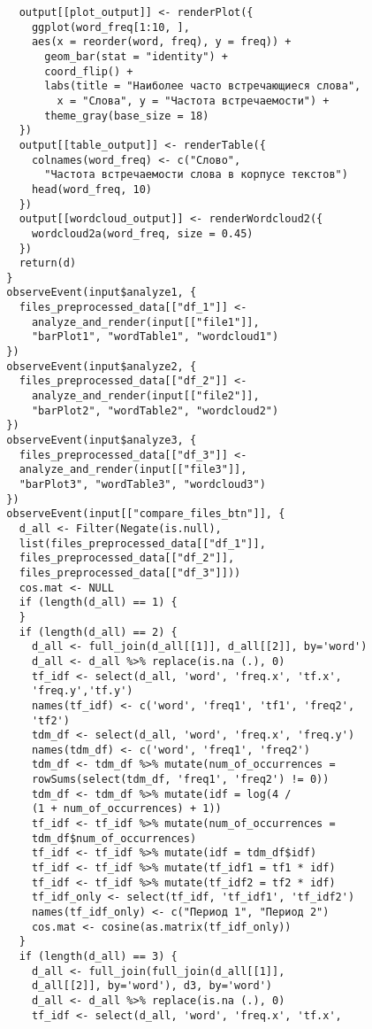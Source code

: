 \documentclass[bachelor, och, diploma ]{SCWorks}
\begin{document}
\begin{verbatim}
    output[[plot_output]] <- renderPlot({
      ggplot(word_freq[1:10, ], 
      aes(x = reorder(word, freq), y = freq)) +
        geom_bar(stat = "identity") +
        coord_flip() +
        labs(title = "Наиболее часто встречающиеся слова", 
          x = "Слова", y = "Частота встречаемости") +
        theme_gray(base_size = 18)
    })
    output[[table_output]] <- renderTable({
      colnames(word_freq) <- c("Слово", 
        "Частота встречаемости слова в корпусе текстов")
      head(word_freq, 10)
    })
    output[[wordcloud_output]] <- renderWordcloud2({
      wordcloud2a(word_freq, size = 0.45)
    })
    return(d)
  }
  observeEvent(input$analyze1, {
    files_preprocessed_data[["df_1"]] <- 
      analyze_and_render(input[["file1"]],
      "barPlot1", "wordTable1", "wordcloud1")
  })
  observeEvent(input$analyze2, {
    files_preprocessed_data[["df_2"]] <- 
      analyze_and_render(input[["file2"]], 
      "barPlot2", "wordTable2", "wordcloud2")
  })
  observeEvent(input$analyze3, {
    files_preprocessed_data[["df_3"]] <- 
    analyze_and_render(input[["file3"]], 
    "barPlot3", "wordTable3", "wordcloud3")
  })
  observeEvent(input[["compare_files_btn"]], {
    d_all <- Filter(Negate(is.null), 
    list(files_preprocessed_data[["df_1"]], 
    files_preprocessed_data[["df_2"]], 
    files_preprocessed_data[["df_3"]])) 
    cos.mat <- NULL
    if (length(d_all) == 1) {
    }
    if (length(d_all) == 2) {
      d_all <- full_join(d_all[[1]], d_all[[2]], by='word')
      d_all <- d_all %>% replace(is.na (.), 0)
      tf_idf <- select(d_all, 'word', 'freq.x', 'tf.x',
      'freq.y','tf.y')
      names(tf_idf) <- c('word', 'freq1', 'tf1', 'freq2', 
      'tf2')
      tdm_df <- select(d_all, 'word', 'freq.x', 'freq.y')
      names(tdm_df) <- c('word', 'freq1', 'freq2')
      tdm_df <- tdm_df %>% mutate(num_of_occurrences = 
      rowSums(select(tdm_df, 'freq1', 'freq2') != 0))
      tdm_df <- tdm_df %>% mutate(idf = log(4 / 
      (1 + num_of_occurrences) + 1))
      tf_idf <- tf_idf %>% mutate(num_of_occurrences = 
      tdm_df$num_of_occurrences)
      tf_idf <- tf_idf %>% mutate(idf = tdm_df$idf)
      tf_idf <- tf_idf %>% mutate(tf_idf1 = tf1 * idf)
      tf_idf <- tf_idf %>% mutate(tf_idf2 = tf2 * idf)
      tf_idf_only <- select(tf_idf, 'tf_idf1', 'tf_idf2')
      names(tf_idf_only) <- c("Период 1", "Период 2")
      cos.mat <- cosine(as.matrix(tf_idf_only))  
    }
    if (length(d_all) == 3) {
      d_all <- full_join(full_join(d_all[[1]], 
      d_all[[2]], by='word'), d3, by='word')
      d_all <- d_all %>% replace(is.na (.), 0)
      tf_idf <- select(d_all, 'word', 'freq.x', 'tf.x', 

\end{verbatim}
\end{document}
